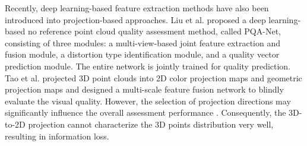 \begin{table*}[!t]
	\centering
	\caption{Selected publicly accessible PCQA datasets.}
	\label{Tab:existing-dataset}
\end{table*}

Recently, deep learning-based feature extraction methods have also been introduced into projection-based approaches.
Liu et al. \citep{liuq21tcsvt} proposed a deep learning-based no reference point cloud quality assessment method, called PQA-Net, consisting of three modules: a multi-view-based joint feature extraction and fusion module, a distortion type identification module, and a quality vector prediction module.
The entire network is jointly trained for quality prediction. 
Tao et al. \citep{Taowx21} projected 3D point clouds into 2D color projection maps and geometric projection maps and designed a multi-scale feature fusion network to blindly evaluate the visual quality. 
However, the selection of projection directions may significantly influence the overall assessment performance \citep{Yangq22,Liuyp22}.
Consequently, the 3D-to-2D projection cannot characterize the 3D points distribution very well, resulting in information loss.

